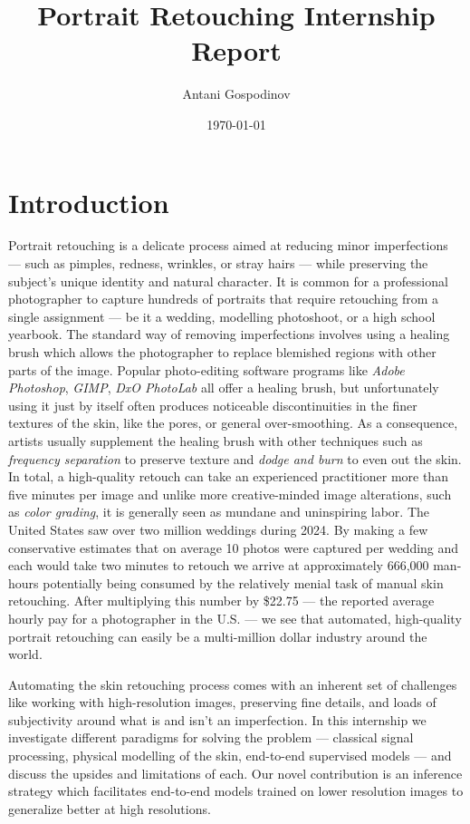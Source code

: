 \documentclass[11pt,a4paper]{article}
\title{Portrait Retouching \textemdash{} Internship Report}
\author{Antani Gospodinov}
\date{\today}
\begin{document}
\maketitle

\tableofcontents
\newpage

\section{Introduction}
Portrait retouching is a delicate process aimed at reducing minor imperfections --- such as pimples, redness, wrinkles, or stray hairs --- while preserving the subject's unique identity and natural character.
It is common for a professional photographer to capture hundreds of portraits that require retouching from a single assignment --- be it a wedding, modelling photoshoot, or a high school yearbook.
The standard way of removing imperfections involves using a healing brush which allows the photographer to replace blemished regions with other parts of the image.
Popular photo-editing software programs like \emph{Adobe Photoshop}, \emph{GIMP}, \emph{DxO PhotoLab} all offer a healing brush, but unfortunately using it just by itself often produces noticeable discontinuities in the finer textures of the skin, like the pores, or general over-smoothing.
As a consequence, artists usually supplement the healing brush with other techniques such as \emph{frequency separation} to preserve texture and \emph{dodge and burn} to even out the skin.
In total, a high-quality retouch can take an experienced practitioner more than five minutes per image and unlike more creative-minded image alterations, such as \emph{color grading}, it is generally seen as mundane and uninspiring labor.
The United States saw over two million weddings during 2024.
By making a few conservative estimates that on average 10 photos were captured per wedding and each would take two minutes to retouch we arrive at approximately 666,000 man-hours potentially being consumed by the relatively menial task of manual skin retouching. 
After multiplying this number by \$22.75 --- the reported average hourly pay for a photographer in the U.S. --- we see that automated, high-quality portrait retouching can easily be a multi-million dollar industry around the world.
\par
Automating the skin retouching process comes with an inherent set of challenges like working with high-resolution images, preserving fine details, and loads of subjectivity around what is and isn't an imperfection. 
In this internship we investigate different paradigms for solving the problem --- classical signal processing, physical modelling of the skin, end-to-end supervised models --- and discuss the upsides and limitations of each.
Our novel contribution is an inference strategy which facilitates end-to-end models trained on lower resolution images to generalize better at high resolutions.
\end{document}
